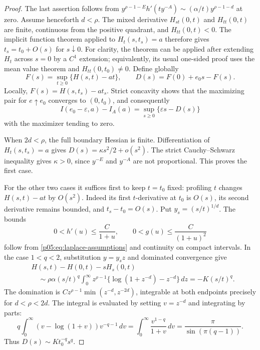 \documentclass[11pt,letterpaper]{article}
\theoremstyle{definition}
\theoremstyle{remark}
\newcommand{\1}{\mathbf 1}
\begin{document}
\begin{proof}
The last assertion follows from
$y^{\rho-1-E}h'(ty^{-A})\sim(\alpha/t)y^{\rho-1-d}$
at zero. Assume henceforth $d<\rho$.
The mixed derivative $H_{st}(0,t)$ and $H_{tt}(0,t)$ are finite,
continuous from the positive quadrant, and $H_{tt}(0,t)<0$.
The implicit function theorem applied to $H_t(s,t_s)=a$ therefore
gives $t_s=t_0+O(s)$ for $s\downarrow0$.
For clarity, the theorem can be applied after extending $H_t$ across
$s=0$ by a $C^1$ extension; equivalently, its usual one-sided proof
uses the mean value theorem and $H_{tt}(0,t_0)\ne0$.
Define globally
\[
 F(s)=\sup_{t\ge0}\{H(s,t)-at\},\qquad
 D(s)=F(0)+e_0s-F(s).
\]
Locally, $F(s)=H(s,t_s)-at_s$.
Strict concavity shows that the maximizing pair for $e\uparrow e_0$
converges to $(0,t_0)$, and consequently
\begin{equation}\label{p05:eq:activation-dual}
 I(e_0-\varepsilon,a)-I_A(a)
 =\sup_{s\ge0}\{\varepsilon s-D(s)\}
\end{equation}
with the maximizer tending to zero.

When $2d<\rho$, the full boundary Hessian is finite. Differentiation
of $H_t(s,t_s)=a$ gives $D(s)=\kappa s^2/2+o(s^2)$.
The strict Cauchy--Schwarz inequality gives $\kappa>0$, since
$y^{-E}$ and $y^{-A}$ are not proportional. This proves the first case.

For the other two cases it suffices first to keep $t=t_0$ fixed:
profiling $t$ changes $H(s,t)-at$ by $O(s^2)$. Indeed its first
$t$-derivative at $t_0$ is $O(s)$, its second derivative remains
bounded, and $t_s-t_0=O(s)$.
Put $y_s=(s/t)^{1/d}$. The bounds
\begin{equation}\label{p05:eq:h-global-bounds}
 0<h'(u)\le\frac{C}{1+u},\qquad
 0<g(u)\le\frac{C}{(1+u)^2}
\end{equation}
follow from \eqref{p05:eq:laplace-assumptions} and continuity on compact
intervals. In the case $1<q<2$, substitution $y=y_sz$ and dominated
convergence give
\begin{align*}
 &H(s,t)-H(0,t)-sH_s(0,t)\\
 &\quad\sim \rho\alpha(s/t)^q
 \int_0^\infty z^{\rho-1}
 \{\log(1+z^{-d})-z^{-d}\}\,dz
 =-K(s/t)^q.
\end{align*}
The domination is $Cz^{\rho-1}\min(z^{-d},z^{-2d})$, integrable
at both endpoints precisely for $d<\rho<2d$.
The integral is evaluated by setting $v=z^{-d}$ and integrating by
parts:
\[
 q\int_0^\infty(v-\log(1+v))v^{-q-1}\,dv
 =\int_0^\infty\frac{v^{1-q}}{1+v}\,dv
 =\frac{\pi}{\sin(\pi(q-1))}.
\]
Thus $D(s)\sim Kt_0^{-q}s^q$.


\end{proof}
\end{document}
